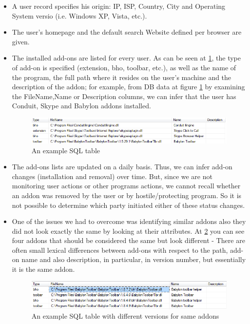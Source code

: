 \documentclass[11pt,oneside]{book}
\begin{document}
\begin{itemize}
\renewcommand{\labelitemi}{$\bullet$} 
\item A user record specifies his origin: IP, ISP, Country, City and Operating System versio (i.e. Windows XP, Vista, etc.).
\item The user's homepage and the default search Website defined per browser are given.
\item The installed add-ons are listed for every user. As can be seen at \ref{fig:db_addons_snapshot}, the type of add-on is specified (extension, bho, toolbar, etc.), as well as the name of the program, the full path where it resides on the user's machine and the description of the addon; for example, from DB data at figure \ref{fig:db_addons_snapshot} by examining the FileName,Name or Description columns, we can infer that the  user has Conduit, Skype and Babylon addons installed.
\begin{figure}[t]
\centering
\begin{small}
\includegraphics[scale=.8,angle=0]{figures/db_addons_snapshot.png}
\end{small}
\caption{An example SQL table}
\label{fig:db_addons_snapshot}
\end{figure}

\item The add-ons lists are updated on a daily basis. Thus, we can infer add-on changes (installation and removal) over time. But, since we are not monitoring user actions or other programs actions, we cannot recall whether an addon was removed by the user or by hostile/protecting program. So it is not possible to determine which party initiated either of these status changes.

\item One of the issues we had to overcome was identifying similar addons also they did not look exactly the same by looking at their attributes. At \ref{fig:addons_versioning_snapshot} you can see four addons that should be considered the same but look different - There are often small lexical differences between
add-ons with respect to the path, add-on name and also description, in particular, in version number, but essentially it is the
same addon.

\begin{figure}[t]
\centering
\begin{small}
\includegraphics[scale=.8,angle=0]{figures/addons_versioning_snapshot.png}
\end{small}
\caption{An example SQL table with different versions for same addons}
\label{fig:addons_versioning_snapshot}
\end{figure}

\end{itemize}
\end{document}
